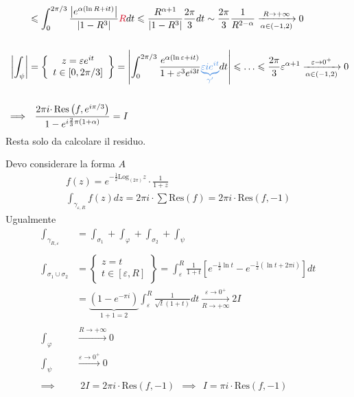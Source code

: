 \begin{equation*}
\begin{aligned}
 & \leqslant \int ^{2\pi /3}_{0}\frac{\left| e^{\alpha (\ln R+it)}\right| }{\left| 1-R^{3}\right| }\textcolor[rgb]{0.82,0.01,0.11}{R} dt\leqslant \frac{R^{\alpha +1}}{\left| 1-R^{3}\right| }\frac{2\pi }{3} dt\sim \frac{2\pi }{3}\frac{1}{R^{2-\alpha }}\xrightarrow[\alpha \in ( -1,2)]{R\rightarrow +\infty } 0\\
 & \\
\left| \int _{\psi }\right|  & =\left\{\begin{array}{ c }
z=\varepsilon e^{it}\\
t\in [ 0,2\pi /3]
\end{array}\right\} =\left| \int ^{2\pi /3}_{0}\frac{e^{\alpha (\ln \varepsilon +it)}}{1+\varepsilon ^{3} e^{i3t}}\textcolor[rgb]{0.29,0.56,0.89}{\underbrace{\varepsilon ie^{it}}_{\gamma '}} dt\right| \leqslant \dotsc \leqslant \frac{2\pi }{3} \varepsilon ^{\alpha +1}\xrightarrow[\alpha \in ( -1,2)]{\varepsilon \rightarrow 0^{+}} 0\\
 & \\
\implies  & \ \ \frac{2\pi i\cdotp \mathrm{Res}\left( f,e^{i\pi /3}\right)}{1-e^{i\frac{2}{3} \pi ( 1+\alpha )}} =I
\end{aligned}
\end{equation*}
Resta solo da calcolare il residuo.
\Soluzione

Devo considerare la forma $A$
\begin{gather*}
f( z) =e^{-\frac{1}{2}\mathrm{Log}_{( 2\pi )} z} \cdotp \frac{1}{1+z}\\
\int _{\gamma _{\varepsilon ,R}} f( z) dz=2\pi i\cdotp \sum \mathrm{Res}( f) =2\pi i\cdotp \mathrm{Res}( f,-1)
\end{gather*}
Ugualmente
\begin{equation*}
\begin{aligned}
\int _{\gamma _{R,\varepsilon }} & =\int _{\sigma _{1}} +\int _{\varphi } +\int _{\sigma _{2}} +\int _{\psi }\\
 & \\
\int _{\sigma _{1} \cup \sigma _{2}} & =\left\{\begin{array}{ c }
z=t\\
t\in [ \varepsilon ,R]
\end{array}\right\} =\int ^{R}_{\varepsilon }\frac{1}{1+t}\left[ e^{-\frac{1}{2}\ln t} -e^{-\frac{1}{2}(\ln t+2\pi i)}\right] dt\\
 & =\underbrace{\left( 1-e^{-\pi i}\right)}_{1+1=2}\int ^{R}_{\varepsilon }\frac{1}{\sqrt{t}( 1+t)} dt\xrightarrow[R\rightarrow +\infty ]{\varepsilon \rightarrow 0^{+}} 2I\\
 & \\
\int _{\varphi } & \xrightarrow{R\rightarrow +\infty } 0\\
\int _{\psi } & \xrightarrow{\varepsilon \rightarrow 0^{+}} 0\\
 & \\
\implies  & \ \ 2I=2\pi i\cdotp \mathrm{Res}( f,-1) \ \ \implies \ \ I=\pi i\cdotp \mathrm{Res}( f,-1)
\end{aligned}
\end{equation*}
\Soluzione

